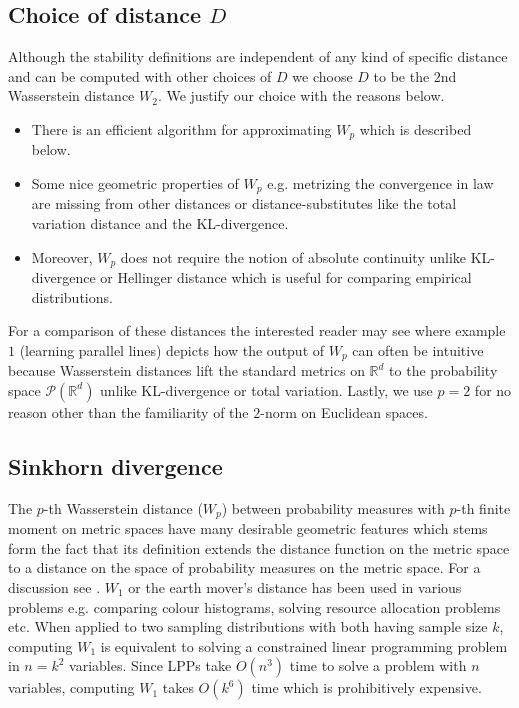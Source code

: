 {\color{mypink}\subsection{Choice of distance \texorpdfstring{$D$}{Lg}} Although the stability definitions are independent of  any kind of specific distance and can be computed with other choices of $D$ we choose $D$ to be the $2$nd Wasserstein distance $W_2$. We justify our choice with the reasons below.
\begin{itemize}
    \item There is an efficient algorithm for approximating $W_p$ which is described below. 
    \item Some nice geometric properties of $W_p$ e.g. metrizing the convergence in law \cite{feydy2019interpolating} are missing from other distances or distance-substitutes like the  total variation distance and  the KL-divergence. 
    \item Moreover, $W_p$ does not require the notion of absolute continuity unlike KL-divergence or Hellinger distance which is useful for comparing empirical distributions.
\end{itemize}
For a comparison of these distances the interested reader may see \cite{arjovsky2017wasserstein} where example $1$ (learning parallel lines) depicts how the output of $W_p$ can often be intuitive because Wasserstein distances lift the standard metrics on $\mathbb R^d$ to the probability space $\mathcal P(\mathbb R^d)$ unlike KL-divergence or total variation. Lastly, we use $p=2$ for no reason other than the familiarity of the $2$-norm on Euclidean spaces.}

\subsection{Sinkhorn divergence} \label{ssec-sink--probing-nfs}

The $p$-th Wasserstein distance ($W_p$) between probability measures with $p$-th finite moment on metric spaces have many desirable geometric features which stems form the fact that its definition extends the distance function on the metric space to a distance on the space of probability measures on the metric space. For a discussion see \cite{feydy2019interpolating, arjovsky2017wasserstein}. $W_1$ or the earth mover's distance has been used in various problems e.g. comparing colour histograms, solving resource allocation problems etc. When applied to two sampling distributions with both having sample size $k$, computing $W_1$ is equivalent to solving a constrained linear programming problem in $n = k^2$ variables. Since LPPs take $O(n^3)$ time to solve a problem with $n$ variables, computing $W_1$ takes $O(k^6)$ time which is prohibitively expensive.

